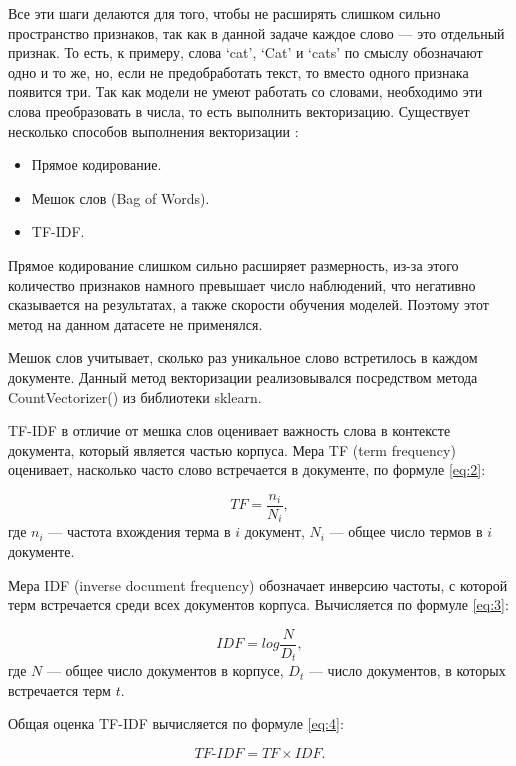 \documentclass[14pt]{mmcs_article}
\begin{document}
Все эти шаги делаются для того, чтобы не расширять слишком сильно пространство признаков, так как в данной задаче каждое слово --- это отдельный признак. То есть, к примеру, слова `cat', `Cat' и `cats' по смыслу обозначают одно и то же, но, если не предобработать текст, то вместо одного признака появится три.
Так как модели не умеют работать со словами, необходимо эти слова преобразовать в числа, то есть выполнить векторизацию. Существует несколько способов выполнения векторизации \cite{lib:vect}:

\begin{itemize}
	\item Прямое кодирование.
	\item Мешок слов (Bag of Words).
	\item TF-IDF. 
\end{itemize}

Прямое кодирование слишком сильно расширяет размерность, из-за этого количество признаков намного превышает число наблюдений, что негативно сказывается на результатах, а также скорости обучения моделей. Поэтому этот метод на данном датасете не применялся.

Мешок слов учитывает, сколько раз уникальное слово встретилось в каждом документе. Данный метод векторизации реализовывался посредством метода CountVectorizer() из библиотеки sklearn.

TF-IDF \cite{lib:tfidf} в отличие от мешка слов оценивает важность слова в контексте документа, который является частью корпуса. Мера TF (term frequency) оценивает, насколько часто слово встречается в документе, по формуле \ref{eq:2}:

\begin{equation}\label{eq:2}
	TF = \frac{n_i}{N_i},
\end{equation}
где $n_i$ --- частота вхождения терма в $i$ документ, $N_i$ — общее число термов в $i$ документе.

Мера IDF (inverse document frequency) обозначает инверсию частоты, с которой терм встречается среди всех документов корпуса. Вычисляется по формуле \ref{eq:3}:

\begin{equation}\label{eq:3}
	IDF = log \frac{N}{D_t},
\end{equation}
где $N$ --- общее число документов в корпусе, $D_t$ --- число документов, в которых встречается терм $t$.

Общая оценка TF-IDF вычисляется по формуле \ref{eq:4}: 

\begin{equation}\label{eq:4}
	TF\text{-}IDF = TF \times IDF.
\end{equation}
\end{document}
